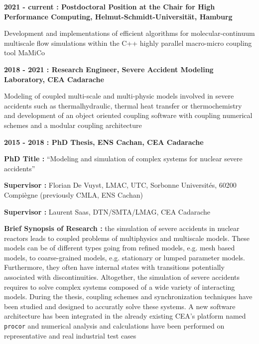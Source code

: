 \documentclass{article}
\renewenvironment{itemize}{
  \begin{list}{}{
      \setlength{\leftmargin}{1.5em}
      \setlength{\itemsep}{0.25em}
      \setlength{\parskip}{0pt}
      \setlength{\parsep}{0.25em}
    }
}{
  \end{list}
}
\begin{document}
	\begin{itemize}
		\item \textbf{2021 - current : Postdoctoral Position at the Chair for High Performance Computing, Helmut-Schmidt-Universität, Hamburg}
			\begin{itemize}
				\item Development and implementations of efficient algorithms for molecular-continuum multiscale flow simulations within the C++ highly parallel macro-micro coupling tool MaMiCo
			\end{itemize}
		\item \textbf{2018 - 2021 : Research Engineer, Severe Accident Modeling Laboratory, CEA Cadarache}
			\begin{itemize}
				\item Modeling of coupled multi-scale and multi-physic models involved in severe accidents such as thermalhydraulic, thermal heat transfer or thermochemistry and development of an object oriented coupling software with coupling numerical schemes and a modular coupling architecture
			\end{itemize}
		\item \textbf{2015 - 2018 : PhD Thesis, ENS Cachan, CEA Cadarache}
			\begin{itemize}
				\item \textbf{PhD Title :} ``Modeling and simulation of complex systems for nuclear severe accidents''
				\item \textbf{Supervisor :} Florian De Vuyst, LMAC, UTC, Sorbonne Universités, 60200 Compiègne (previously CMLA, ENS Cachan)
				\item \textbf{Supervisor :} Laurent Saas, DTN/SMTA/LMAG, CEA Cadarache
				\item \textbf{Brief Synopsis of Research :} the simulation of severe accidents in nuclear reactors leads to coupled problems of multiphysics and multiscale models. These models can be of different types going from refined models, e.g. mesh based models, to coarse-grained models, e.g. stationary or lumped parameter models. Furthermore, they often have internal states with transitions potentially associated with discontinuities. Altogether, the simulation of severe accidents requires to solve complex systems composed of a wide variety of interacting models. During the thesis, coupling schemes and synchronization techniques have been studied and designed to accuratly solve these systems. A new software architecture has been integrated in the already existing CEA's platform named \texttt{procor} and numerical analysis and calculations have been performed on representative and real industrial test cases

\end{itemize}
\end{itemize}
\end{document}
